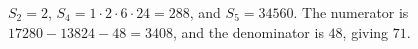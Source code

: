 $S_2=2$, $S_4=1\cdot2\cdot6\cdot24=288$, and $S_5=34560$. The numerator is $17280-13824-48=3408$, and the denominator is $48$, giving $\boxed{71}$.
